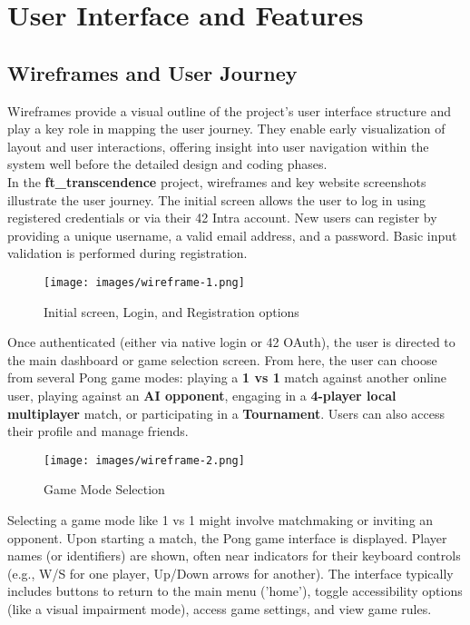 \chapter{User Interface and Features}
\label{ch:ui}

\section{Wireframes and User Journey}

Wireframes provide a visual outline of the project’s user interface structure and play a key role in mapping the user journey. They enable early visualization of layout and user interactions, offering insight into user navigation within the system well before the detailed design and coding phases.\\
In the \textbf{ft\_transcendence} project, wireframes and key website screenshots illustrate the user journey. The initial screen allows the user to log in using registered credentials or via their 42 Intra account. New users can register by providing a unique username, a valid email address, and a password. Basic input validation is performed during registration.

\begin{figure}[H]
    \texttt{[image: images/wireframe-1.png]}
    \caption{Initial screen, Login, and Registration options}
    \label{fig:init-screen}
\end{figure}

Once authenticated (either via native login or 42 OAuth), the user is directed to the main dashboard or game selection screen. From here, the user can choose from several Pong game modes: playing a \textbf{1 vs 1} match against another online user, playing against an \textbf{AI opponent}, engaging in a \textbf{4-player local multiplayer} match, or participating in a \textbf{Tournament}. Users can also access their profile and manage friends.

\begin{figure}[H]
    \texttt{[image: images/wireframe-2.png]}
    \caption{Game Mode Selection}
    \label{fig:game-selection}
\end{figure}

Selecting a game mode like 1 vs 1 might involve matchmaking or inviting an opponent. Upon starting a match, the Pong game interface is displayed. Player names (or identifiers) are shown, often near indicators for their keyboard controls (e.g., W/S for one player, Up/Down arrows for another). The interface typically includes buttons to return to the main menu ('home'), toggle accessibility options (like a visual impairment mode), access game settings, and view game rules.

